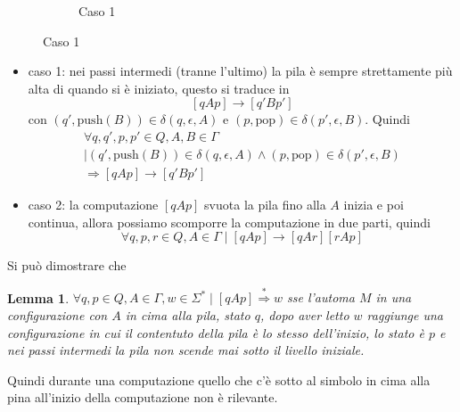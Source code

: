 \documentclass[12pt]{report}
\newtheorem{lemma}{Lemma}
\begin{document}
\begin{itemize}
\begin{figure}[H]
\begin{subfigure}{0.45\textwidth}
				\caption{Caso 1}
			\end{subfigure}
		\end{figure}
		\begin{itemize}
			\item caso 1: nei passi intermedi (tranne l'ultimo) la pila è sempre strettamente più alta di quando si è iniziato, questo si traduce in
				$$ [qAp] \rightarrow [q'Bp'] $$
				con $(q', \text{push}(B)) \in \delta(q, \epsilon, A)$ e $(p, \text{pop}) \in \delta(p', \epsilon, B)$.
				Quindi 
				\begin{multline*}
				\forall q, q', p, p' \in Q, A, B \in \Gamma \\ \mid
					(q', \text{push}(B)) \in \delta(q, \epsilon, A) \wedge (p, \text{pop}) \in \delta(p', \epsilon, B) \\
					\Rightarrow [qAp] \rightarrow [q'Bp'] 
				\end{multline*}
			\item caso 2: la computazione $[qAp]$ svuota la pila fino alla $A$ inizia e poi continua, allora possiamo scomporre la computazione in due parti, quindi
				$$ \forall q, p, r \in Q, A \in \Gamma \mid [qAp] \rightarrow [qAr][rAp] $$
		\end{itemize}
\end{itemize}
Si può dimostrare che
\begin{lemma}
	$\forall q, p \in Q, A \in \Gamma, w \in \Sigma^* \mid [qAp] \overset{*}{\Rightarrow} w$ sse 
	l'automa $M$ in una configurazione con $A$ in cima alla pila, stato $q$, dopo aver letto $w$ raggiunge una configurazione in cui il contentuto della pila è lo stesso dell'inizio, lo stato è $p$ e nei passi intermedi la pila non scende mai sotto il livello iniziale.
\end{lemma}
Quindi durante una computazione quello che c'è sotto al simbolo in cima alla pina all'inizio della computazione non è rilevante.
\end{document}
